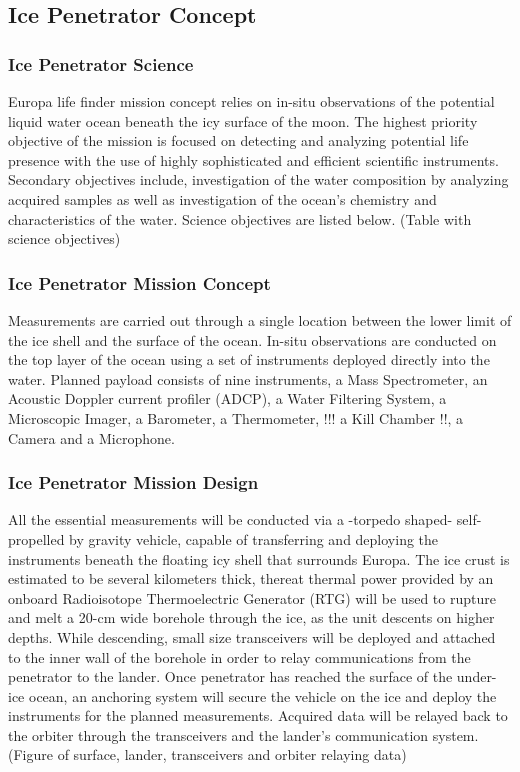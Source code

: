 \subsection{Ice Penetrator Concept}

\subsubsection{Ice Penetrator Science}

Europa life finder mission concept relies on in-situ observations of the potential liquid water ocean beneath the icy surface of the moon. The highest priority objective of the mission is focused on detecting and analyzing potential life presence with the use of highly sophisticated and efficient scientific instruments. Secondary objectives include, investigation of the water composition by analyzing acquired samples as well as investigation of the ocean’s chemistry and characteristics of the water.
Science objectives are listed below.
(Table with science objectives)

\subsubsection{Ice Penetrator Mission Concept}

Measurements are carried out through a single location between the lower limit of the ice shell and the surface of the ocean. In-situ observations are conducted on the top layer of the ocean using a set of instruments deployed directly into the water.
Planned payload consists of nine instruments, a Mass Spectrometer, an Acoustic Doppler current profiler (ADCP), a Water Filtering System, a Microscopic Imager, a Barometer, a Thermometer, !!! a Kill Chamber !!, a Camera and a Microphone.

\subsubsection{Ice Penetrator Mission Design}

All the essential measurements will be conducted via a -torpedo shaped- self-propelled by gravity vehicle, capable of transferring and deploying the instruments beneath the floating icy shell that surrounds Europa. The ice crust is estimated to be several kilometers thick, thereat thermal power provided by an onboard Radioisotope Thermoelectric Generator (RTG) will be used to rupture and melt a 20-cm wide borehole through the ice, as the unit descents on higher depths. While descending, small size transceivers will be deployed and attached to the inner wall of the borehole in order to relay communications from the penetrator to the lander. Once penetrator has reached the surface of the under-ice ocean, an anchoring system will secure the vehicle on the ice and deploy the instruments for the planned measurements. Acquired data will be relayed back to the orbiter through the transceivers and the lander’s communication system. 
(Figure of surface, lander, transceivers and orbiter relaying data)

